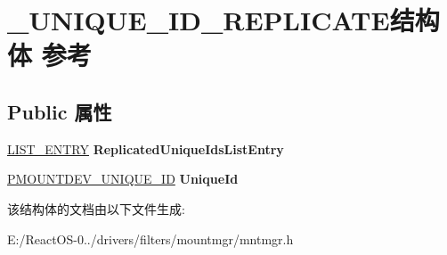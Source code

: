 \hypertarget{struct___u_n_i_q_u_e___i_d___r_e_p_l_i_c_a_t_e}{}\section{\+\_\+\+U\+N\+I\+Q\+U\+E\+\_\+\+I\+D\+\_\+\+R\+E\+P\+L\+I\+C\+A\+T\+E结构体 参考}
\label{struct___u_n_i_q_u_e___i_d___r_e_p_l_i_c_a_t_e}
\subsection*{Public 属性}
\begin{DoxyCompactItemize}
\item 
\mbox{\label{struct___u_n_i_q_u_e___i_d___r_e_p_l_i_c_a_t_e_aa58c9478ca5cefc6326d62ffc0dd77f6}} 
\hyperlink{struct___l_i_s_t___e_n_t_r_y}{L\+I\+S\+T\+\_\+\+E\+N\+T\+RY} {\bfseries Replicated\+Unique\+Ids\+List\+Entry}
\item 
\mbox{\label{struct___u_n_i_q_u_e___i_d___r_e_p_l_i_c_a_t_e_a68d9fee2641a9576153dac1101dc0daa}} 
\hyperlink{struct___m_o_u_n_t_d_e_v___u_n_i_q_u_e___i_d}{P\+M\+O\+U\+N\+T\+D\+E\+V\+\_\+\+U\+N\+I\+Q\+U\+E\+\_\+\+ID} {\bfseries Unique\+Id}
\end{DoxyCompactItemize}


该结构体的文档由以下文件生成\+:\begin{DoxyCompactItemize}
\item 
E\+:/\+React\+O\+S-\/0../drivers/filters/mountmgr/mntmgr.\+h\end{DoxyCompactItemize}
